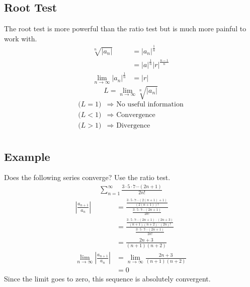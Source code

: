 \documentclass{article}
\theoremstyle{mytheoremstyle}
\theoremstyle{mytheoremstyle}
\theoremstyle{myproblemstyle}
\begin{document}
    \subsection*{Root Test}
    The root test is more powerful than the ratio test but is much more painful
    to work with.
    \begin{align*}
        \sqrt[n]{|a_n|}
        &= |a_n|^{\frac{1}{n}} \\
        &= |a|^{\frac{1}{n}}|r|^{\frac{n-1}{n}} \\
        \lim_{n\to \infty} |a_n|^{\frac{1}{n}} &= |r|
    \end{align*}
    \[
        L = \lim_{n\to \infty} \sqrt[n]{|a_n|}
    \]
    \begin{align*}
        \big(L = 1\big) &\Rightarrow \text{ No useful information} \\
        \big(L < 1\big) &\Rightarrow \text{ Convergence} \\
        \big(L > 1\big) &\Rightarrow \text{ Divergence} \\
    \end{align*}

    \subsection*{Example}
    Does the following series converge? Use the ratio test.
    \begin{align*}
        \sum_{n=1}^{\infty} \frac{3\cdot 5\cdot 7\cdots (2n+1)}{2n!}
    \end{align*}
    \begin{align*}
        | \frac{a_{n+1}}{a_n} |
        &= 
        \frac{\frac{3\cdot 5\cdot 7\cdots (2(n+1)+1)}{(2(n+1))!}}
        {\frac{3\cdot 5\cdot 7\cdots (2n+1)}{2n!}} \\
        &= 
        \frac{\frac{3\cdot 5\cdot 7\cdots (2n+1)\cdot(2n+3)}{(n+1)(n+2)\cdot(2n)!}}
        {\frac{3\cdot 5\cdot 7\cdots (2n+1)}{2n!}} \\
        &= 
        \frac{2n+3} {(n+1)(n+2)} \\
        \lim_{n\to \infty} | \frac{a_{n+1}}{a_n} |
        &= \lim_{n\to \infty} \frac{2n+3} {(n+1)(n+2)} \\
        &= 0
    \end{align*}
    Since the limit goes to zero, this sequence is absolutely convergent.
\end{document}
